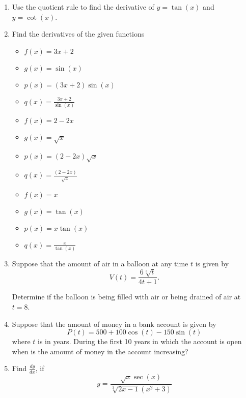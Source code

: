 \documentclass{article}
\begin{document}
\begin{enumerate}
\item Use the quotient rule to find the derivative of $y = \tan(x)$ and $y = \cot(x)$.
\item Find the derivatives of the given functions

\begin{multicols}{3}
\begin{itemize}
    \item $f(x) = 3x+2$
    \item $g(x) = \sin(x)$
    \item $p(x) = (3x+2)\sin(x)$
    \item $q(x) = \frac{3x+2}{\sin(x)}$
    \item $f(x) = 2-2x $
    \item $g(x) = \sqrt{x}$
    \item $p(x) = (2 - 2x)\sqrt{x}$
    \item $q(x) = \frac{(2-2x)}{\sqrt{x}} $
    \item $f(x) = x$
    \item $g(x) = \tan(x)$
    \item $p(x) = x\tan(x) $
    \item $q(x) = \frac{x}{\tan(x)}$
\end{itemize}
\end{multicols}
\item Suppose that the amount of air in a balloon at any time $t$ is given by
$$V(t) = \frac{6\sqrt[3]{t}}{4t+1}.$$

Determine if the balloon is being filled with air or being drained of air at $t=8$.

\item Suppose that the amount of money in a bank account is given by
$$P(t)=500+100\cos(t) - 150\sin(t)$$
where $t$
 is in years. During the first 10 years in which the account is open when is the amount of money in the account increasing?

\item Find $\frac{dy}{dx}$, if $$y = \frac{\sqrt{x}\sec(x)}{\sqrt[3]{2x-1}(x^2 + 3)}$$
\end{enumerate}
\end{document}
